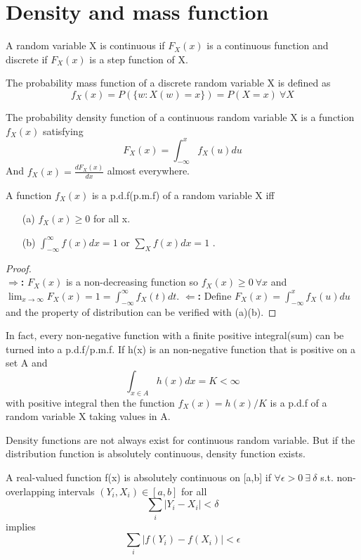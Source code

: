 \documentclass[../Probability_Theory.tex]{subfiles}
\begin{document}
\section{Density and mass function}
\begin{definition}
A random variable X is continuous if $F_X(x)$ is a continuous function and discrete if $F_X(x)$ is a step function of X.
\end{definition}
\begin{definition}[p.m.f]
The probability mass function of a discrete random variable X is defined as $$f_X(x)=P(\{w:X(w)=x\})=P(X=x)\ \forall X$$
\end{definition}
\begin{definition}[p.d.f]
The probability density function of a continuous random variable X is a function $f_X(x)$ satisfying $$F_X(x)=\int_{-\infty}^xf_X(u)du$$
And $f_X(x)=\frac{dF_X(x)}{dx}$ almost everywhere.
\end{definition}
\begin{property}A function $f_X(x)$ is a p.d.f(p.m.f) of a random variable X iff
\begin{enumerate}
\item[(a)]$f_X(x)\geq 0$ for all x.
\item[(b)]$\int_{-\infty}^\infty f(x)dx=1$ or $\sum_X f(x)dx=1$ .
\end{enumerate}
\end{property}
\begin{proof}\\
{\bf $\Rightarrow$:} $F_X(x)$ is a non-decreasing function so $f_X(x)\geq0\ \forall x$ and $\lim_{x\rightarrow\infty}F_X(x)=1=\int_{-\infty}^\infty f_X(t)dt$.
{\bf $\Leftarrow$:} Define $F_X(x)=\int_{-\infty}^x f_X(u)du$ and the property of distribution can be verified with (a)(b).
\end{proof}
\begin{intuition}[Changed to p.d.f]
In fact, every non-negative function with a finite positive integral(sum) can be turned into a p.d.f/p.m.f. If h(x) is an non-negative function that is positive on a set A and $$\int_{x\in A}h(x)dx=K<\infty$$ with positive integral then the function $f_X(x)=h(x)/K$ is a p.d.f of a random variable X taking values in A.
\end{intuition}
Density functions are not always exist for continuous random variable. But if the distribution function is absolutely continuous, density function exists. 
\begin{remark}
A real-valued function f(x) is absolutely continuous on [a,b] if $\forall\epsilon>0\ \exists\ \delta$ s.t. non-overlapping intervals $(Y_i,X_i)\in[a,b]$ for all $$\sum_i|Y_i-X_i|<\delta$$ implies $$\sum_i|f(Y_i)-f(X_i)|<\epsilon$$
\end{remark}
\end{document}
